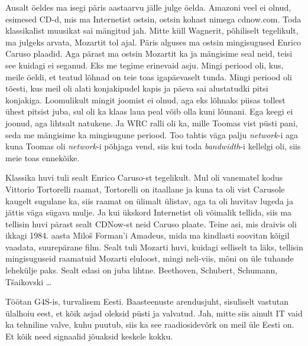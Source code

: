 Ausalt öeldes ma isegi päris aastaarvu jälle julge öelda. Amazoni veel ei olnud, 
esimesed CD-d, mis ma Internetist ostsin, ostsin kohast nimega cdnow.com. 
Toda klassikalist muusikat sai mängitud jah. Mitte küll 
Wagnerit, põhiliselt tegelikult, ma julgeks arvata, Mozartit tol ajal. Päris 
alguses ma ostsin mingisugused Enrico Caruso plaadid. Aga pärast ma ostsin 
Mozartit ka ja mängisime seal neid, teisi see kuidagi ei seganud. Eks me tegime 
erinevaid asju. Mingi periood oli, kus, meile öeldi, et teatud lõhnad on teie 
toas igapäevaselt tunda. Mingi periood oli tõesti, kus meil oli alati 
konjakipudel kapis  ja päeva sai alustatudki pitsi konjakiga. Loomulikult 
mingit joomist ei olnud, aga eks lõhnaks piisas tollest ühest pitsist juba, sul oli ka klaas 
laua peal võib olla kuni lõunani. Ega keegi ei joonud, aga lihtsalt natukene. 
Ja WRC ralli oli ka, mille Toomas vist püsti pani, seda me 
mängisime ka  mingisugune periood. Too tahtis väga palju \emph{network}-i 
aga kuna Toomas oli \emph{network}-i põhjaga vend, siis kui toda 
\emph{bandwidth}-i kellelgi oli, siis meie toas ennekõike.


Klassika huvi tuli sealt Enrico Caruso-st tegelikult. Mul oli vanematel kodus 
Vittorio Tortorelli raamat, Tortorelli  on itaallane ja kuna ta oli vist 
Carusole kaugelt sugulane ka, siis raamat 
on ülimalt ülistav, aga ta oli huvitav lugeda ja jättis väga sügava mulje. 
Ja kui ükskord Internetist  oli võimalik tellida, siis ma tellisin huvi pärast sealt 
CDNow-st neid Caruso plaate. Teine asi, mis draivis oli ikkagi 1984. aasta 
Miloš Forman'i Amadeus, mida ma kindlasti soovitan kõigil vaadata, suurepärane 
film. Sealt tuli Mozarti huvi, kuidagi selliselt ta läks,  tellisin 
mingisuguseid raamatuid Mozarti eluloost, mingi neli-viis, mõni on üle tuhande 
lehekülje paks. Sealt edasi on juba  lihtne. Beethoven, Schubert, 
Schumann, Tšaikovski \ldots


Töötan G4S-is, turvalisem Eesti. Baasteenuste arendusjuht,  
sisuliselt  vastutan ülalhoiu eest, et kõik asjad oleksid püsti ja valvatud. 
Jah, mitte siis ainult IT vaid ka  tehniline valve, kuhu puutub, siis ka see 
raadiosidevõrk on meil üle Eesti on. Et kõik need signaalid jõuaksid  keskele 
kokku.
